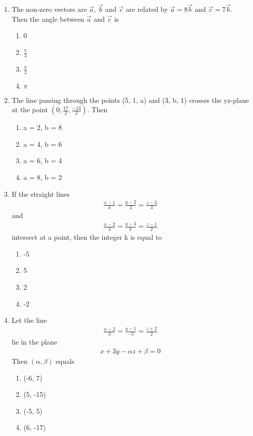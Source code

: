 \begin{enumerate}[label=\arabic*.,ref=\thesubsection.\theenumi]
\item The non-zero vectors are $\overrightarrow{a}$, $\overrightarrow{b}$ and $\overrightarrow{c}$ are related by 
$\overrightarrow{a} = 8\overrightarrow{b}$ and $\overrightarrow{c} = 7\overrightarrow{b}$. Then the angle between 
$\overrightarrow{a}$ and $\overrightarrow{c}$ is
\begin{enumerate}
\item 0
\item $\frac{\pi}{4}$
\item $\frac{\pi}{2}$
\item $\pi$
\end{enumerate}

\item The line passing through the points (5, 1, a) and (3, b, 1) crosses the yz-plane at the point $(0,\frac{17}{2},\frac{-13}{2})$. Then
\begin{enumerate}
\item a = 2, b = 8
\item a = 4, b = 6
\item a = 6, b = 4
\item a = 8, b = 2
\end{enumerate}

\item If the straight lines 
\begin{align*}
\frac{x - 1}{k} = \frac{y - 2}{2} = \frac{z - 3}{3}
\end{align*}
and 
\begin{align*}
\frac{x - 2}{3} = \frac{y - 3}{k} = \frac{z - 1}{2}
\end{align*}
intersect at a point, then the integer k is equal to
\begin{enumerate}
\item -5
\item 5
\item 2
\item -2
\end{enumerate}

\item Let the line
\begin{align*}
\frac{x - 2}{3} = \frac{y - 1}{-5} = \frac{z + 2}{2}
\end{align*}
lie in the plane 
\begin{align*}
x + 3y - \alpha z + \beta = 0
\end{align*}
Then $(\alpha, \beta)$ equals
\begin{enumerate}
\item (-6, 7)
\item (5, -15)
\item (-5, 5)
\item (6, -17)
\end{enumerate}


\end{enumerate}
